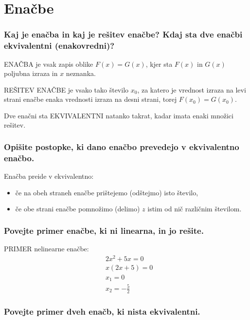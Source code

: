 \documentclass{article}
\begin{document}
\section{Enačbe}
\subsubsection*{Kaj je enačba in kaj je rešitev enačbe? Kdaj sta dve enačbi ekvivalentni (enakovredni)?}

ENAČBA je vsak zapis oblike $F(x)=G(x)$, kjer sta $F(x)$ in $G(x)$ poljubna izraza in $x$ neznanka. 

REŠITEV ENAČBE je vsako tako število $x_{0}$, za katero je vrednost izraza na levi strani enačbe enaka vrednosti izraza na desni strani, torej $F\left(x_{0}\right)=G\left(x_{0}\right)$.

Dve enačni sta EKVIVALENTNI natanko takrat, kadar imata enaki množici rešitev.

\subsubsection*{Opišite postopke, ki dano enačbo prevedejo v ekvivalentno enačbo.}

Enačba preide v ekvivalentno:
\begin{itemize}
  \item če na obeh straneh enačbe prištejemo (odštejmo) isto število,

  \item če obe strani enačbe pomnožimo (delimo) $z$ istim od nič različnim številom.
\end{itemize}

\subsubsection*{Povejte primer enačbe, ki ni linearna, in jo rešite.}

PRIMER nelinearne enačbe:
$$
\begin{aligned}
& 2 x^{2}+5 x=0 \\
& x(2 x+5)=0 \\
& x_{1}=0 \\
& x_{2}=-\frac{5}{2}
\end{aligned}
$$

\subsubsection*{Povejte primer dveh enačb, ki nista ekvivalentni.}
\end{document}
